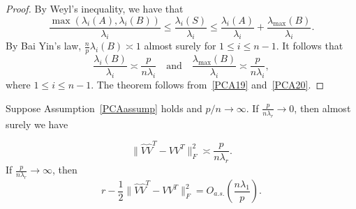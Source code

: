 \begin{proof}
    By Weyl's inequality, we have that
    \begin{equation}\label{PCA19}
        \frac{\max(\lambda_i(A),\lambda_i(B))}{\lambda_i}\leq\frac{\lambda_i(S)}{\lambda_i}\leq \frac{\lambda_i(A)}{\lambda_i} +\frac{\lambda_{\max}(B)}{\lambda_i}.
    \end{equation}
    By Bai Yin's law, $\frac{n}{p}\lambda_{i}(B)\asymp 1$ almost surely for $1\leq i\leq n-1$. It follows that 
    \begin{equation}\label{PCA20}
        \frac{\lambda_{i}(B)}{\lambda_i}\asymp\frac{p}{n\lambda_i}
        \quad \textrm{and}\quad
        \frac{\lambda_{\max}(B)}{\lambda_i}\asymp\frac{p}{n\lambda_i},
    \end{equation}
    where $1\leq i\leq n-1$. The theorem follows from~\eqref{PCA19} and~\eqref{PCA20}.
\end{proof}



\begin{theorem}
    Suppose Assumption~\ref{PCAassump} holds and $p/n\to \infty$.
    If  $\frac{p}{n\lambda_r}\to 0$, then almost surely we have

    \begin{equation}\label{PCAtheorem101}
        \|\hat{V}\hat{V}^T-VV^T\|^2_F\asymp\frac{p}{n\lambda_r }.
    \end{equation}
    If  $\frac{p}{n\lambda_r}\to \infty$, then
    \begin{equation}\label{PCAtheorem102}
        r-\frac{1}{2}\|\hat{V}\hat{V}^T-VV^T\|^2_F=O_{a.s.}(\frac{n\lambda_1}{p}).
    \end{equation}
\end{theorem}


